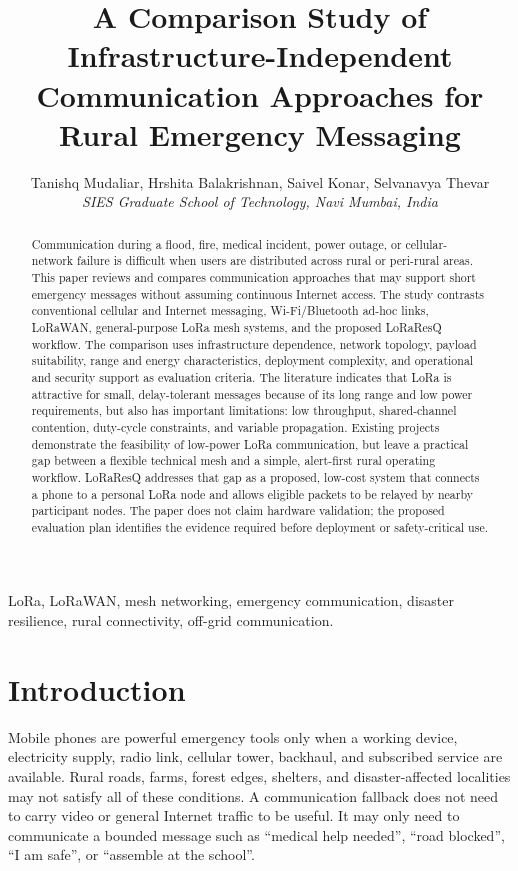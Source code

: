 \documentclass[journal]{IEEEtran}
\title{A Comparison Study of Infrastructure-Independent Communication
Approaches for Rural Emergency Messaging}
\author{
Tanishq Mudaliar, Hrshita Balakrishnan, Saivel Konar, Selvanavya Thevar\\[0.5ex]
\textit{SIES Graduate School of Technology, Navi Mumbai, India}
}
\begin{document}
\maketitle

\begin{abstract}
Communication during a flood, fire, medical incident, power outage, or
cellular-network failure is difficult when users are distributed across rural
or peri-rural areas. This paper reviews and compares communication approaches
that may support short emergency messages without assuming continuous Internet
access. The study contrasts conventional cellular and Internet messaging,
Wi-Fi/Bluetooth ad-hoc links, LoRaWAN, general-purpose LoRa mesh systems, and
the proposed LoRaResQ workflow. The comparison uses infrastructure dependence,
network topology, payload suitability, range and energy characteristics,
deployment complexity, and operational and security support as evaluation
criteria.
The literature indicates that LoRa is attractive for small, delay-tolerant
messages because of its long range and low power requirements, but also has
important limitations: low throughput, shared-channel contention, duty-cycle
constraints, and variable propagation. Existing projects demonstrate the
feasibility of low-power LoRa communication, but leave a practical gap
between a flexible technical mesh and a simple, alert-first rural operating
workflow. LoRaResQ addresses that gap as a proposed, low-cost system that
connects a phone to a personal LoRa node and allows eligible packets to be
relayed by nearby participant nodes. The paper does not claim hardware
validation; the proposed evaluation plan identifies the evidence required
before deployment or safety-critical use.
\end{abstract}

\begin{IEEEkeywords}
LoRa, LoRaWAN, mesh networking, emergency communication, disaster resilience,
rural connectivity, off-grid communication.
\end{IEEEkeywords}

\section{Introduction}
Mobile phones are powerful emergency tools only when a working device,
electricity supply, radio link, cellular tower, backhaul, and subscribed
service are available. Rural roads, farms, forest edges, shelters, and
disaster-affected localities may not satisfy all of these conditions. A
communication fallback does not need to carry video or general Internet
traffic to be useful. It may only need to communicate a bounded message such
as ``medical help needed'', ``road blocked'', ``I am safe'', or ``assemble at
the school''.
\end{document}
